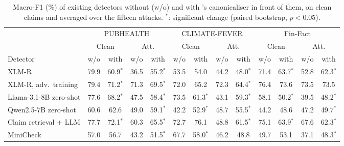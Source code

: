 \begin{table}[t]\centering\small\setlength{\tabcolsep}{2.8pt}
\begin{adjustbox}{max width=\textwidth}\begin{tabular}{lcccccccccccc}
\toprule
 & \multicolumn{4}{c}{PUBHEALTH} & \multicolumn{4}{c}{CLIMATE-FEVER} & \multicolumn{4}{c}{Fin-Fact} \\
\cmidrule(lr){2-5} \cmidrule(lr){6-9} \cmidrule(lr){10-13}
 & \multicolumn{2}{c}{Clean} & \multicolumn{2}{c}{Att.} & \multicolumn{2}{c}{Clean} & \multicolumn{2}{c}{Att.} & \multicolumn{2}{c}{Clean} & \multicolumn{2}{c}{Att.} \\
Detector & w/o & with & w/o & with & w/o & with & w/o & with & w/o & with & w/o & with \\
\midrule
XLM-R \citep{conneau2020xlmr} & 79.9 & 60.9$^{*}$ & 36.5 & 55.2$^{*}$ & 53.5 & 54.0 & 44.2 & 48.0$^{*}$ & 71.4 & 63.7$^{*}$ & 52.8 & 62.3$^{*}$ \\
XLM-R, adv.\ training \citep{conneau2020xlmr} & 79.4 & 71.2$^{*}$ & 71.3 & 69.5$^{*}$ & 72.0 & 65.2 & 72.3 & 64.4$^{*}$ & 76.4 & 73.6 & 73.5 & 73.5 \\
Llama-3.1-8B zero-shot \citep{grattafiori2024llama3} & 77.6 & 68.2$^{*}$ & 47.5 & 58.4$^{*}$ & 73.5 & 61.3$^{*}$ & 43.1 & 59.3$^{*}$ & 58.1 & 50.2$^{*}$ & 39.5 & 48.2$^{*}$ \\
Qwen2.5-7B zero-shot \citep{qwen2024qwen25} & 60.6 & 62.6 & 49.0 & 59.1$^{*}$ & 42.2 & 52.9$^{*}$ & 48.7 & 55.5$^{*}$ & 44.2 & 48.6 & 47.2 & 49.7$^{*}$ \\
Claim retrieval + LLM \citep{pikuliak2023multiclaim} & 77.7 & 72.1$^{*}$ & 60.3 & 65.5$^{*}$ & 72.7 & 76.1 & 48.8 & 61.5$^{*}$ & 75.1 & 63.9$^{*}$ & 67.6 & 62.3$^{*}$ \\
MiniCheck \citep{tang2024minicheck} & 57.0 & 56.7 & 43.2 & 51.5$^{*}$ & 67.7 & 58.0$^{*}$ & 46.2 & 48.8 & 49.7 & 53.1 & 37.1 & 48.3$^{*}$ \\
\bottomrule
\end{tabular}\end{adjustbox}
\caption{Macro-F1 (\%) of existing detectors without (w/o) and with \method{}'s canonicaliser in front of them, on clean claims and averaged over the fifteen attacks. $^{*}$: significant change (paired bootstrap, $p<0.05$).}
\label{tab:plugin}
\end{table}
